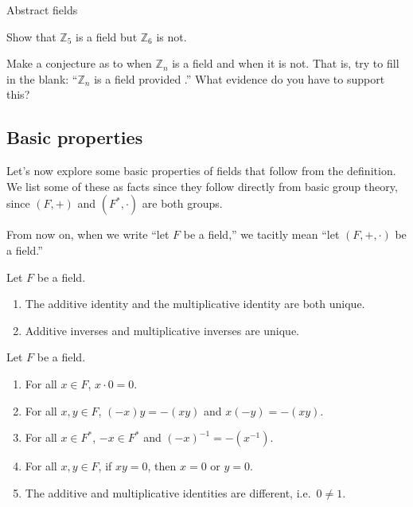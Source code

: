 \begin{section}{Abstract fields}
\begin{problem}
Show that $\mathbb{Z}_5$ is a field but $\mathbb{Z}_6$ is not.
\end{problem}

\begin{problem}\label{prob.ConjectureZn}
Make a conjecture as to when $\mathbb{Z}_n$ is a field and when it is not. That is, try to fill in the blank: ``$\mathbb{Z}_n$ is a field provided .'' What evidence do you have to support this?
\end{problem}

\subsection{Basic properties}

Let's now explore some basic properties of fields that follow from the definition. We list some of these as facts since they follow directly from basic group theory, since $(F,+)$ and $(F^*,\cdot)$ are both groups. 

From now on, when we write ``let $F$ be a field,'' we tacitly mean ``let $(F,+,\cdot)$ be a field.''

\begin{fact}
Let $F$ be a field. 
\begin{enumerate}
\item The additive identity and the multiplicative identity are both unique.
\item Additive inverses and multiplicative inverses are unique.
\end{enumerate}
\end{fact}

\begin{theorem}\label{thm.BasicFieldProps}
Let $F$ be a field. 
\begin{enumerate}
\item For all $x\in F$, $x\cdot0 = 0$.
\item For all $x,y\in F$, $(-x)y = -(xy)$ and $x(-y) = -(xy)$.
\item For all $x\in F^*$, $-x\in F^*$ and $(-x)^{-1} = -(x^{-1})$.
\item For all $x,y\in F$, if $xy = 0$, then $x=0$ or $y=0$.
\item The additive and multiplicative identities are different, i.e.~$0\neq 1$.
\end{enumerate}
\end{theorem}


\end{section}
